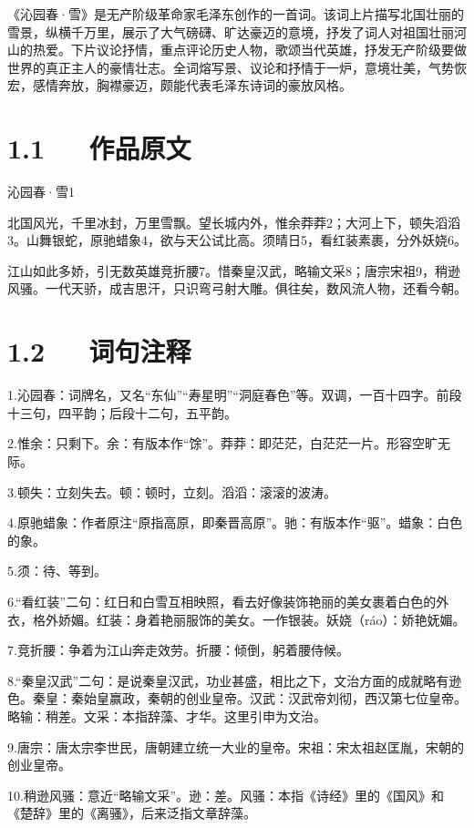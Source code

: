 \documentclass[letterpaper,12pt,english]{sphinxmanual}
\begin{document}
《沁园春·雪》是无产阶级革命家毛泽东创作的一首词。该词上片描写北国壮丽的雪景，纵横千万里，展示了大气磅礴、旷达豪迈的意境，抒发了词人对祖国壮丽河山的热爱。下片议论抒情，重点评论历史人物，歌颂当代英雄，抒发无产阶级要做世界的真正主人的豪情壮志。全词熔写景、议论和抒情于一炉，意境壮美，气势恢宏，感情奔放，胸襟豪迈，颇能代表毛泽东诗词的豪放风格。


\section{1.1   作品原文}
\label{\detokenize{p01_u6563_u6587/_u6bdb_u6cfd_u4e1c-_u6c81_u56ed_u6625_xb7_u96ea:id3}}
沁园春·雪1

北国风光，千里冰封，万里雪飘。望长城内外，惟余莽莽2；大河上下，顿失滔滔3。山舞银蛇，原驰蜡象4，欲与天公试比高。须晴日5，看红装素裹，分外妖娆6。

江山如此多娇，引无数英雄竞折腰7。惜秦皇汉武，略输文采8；唐宗宋祖9，稍逊风骚。一代天骄，成吉思汗，只识弯弓射大雕。俱往矣，数风流人物，还看今朝。


\section{1.2   词句注释}
\label{\detokenize{p01_u6563_u6587/_u6bdb_u6cfd_u4e1c-_u6c81_u56ed_u6625_xb7_u96ea:id4}}
1.沁园春：词牌名，又名“东仙”“寿星明”“洞庭春色”等。双调，一百十四字。前段十三句，四平韵；后段十二句，五平韵。

2.惟余：只剩下。余：有版本作“馀”。莽莽：即茫茫，白茫茫一片。形容空旷无际。

3.顿失：立刻失去。顿：顿时，立刻。滔滔：滚滚的波涛。

4.原驰蜡象：作者原注“原指高原，即秦晋高原”。驰：有版本作“驱”。蜡象：白色的象。

5.须：待、等到。

6.“看红装”二句：红日和白雪互相映照，看去好像装饰艳丽的美女裹着白色的外衣，格外娇媚。红装：身着艳丽服饰的美女。一作银装。妖娆（ráo）：娇艳妩媚。

7.竞折腰：争着为江山奔走效劳。折腰：倾倒，躬着腰侍候。

8.“秦皇汉武”二句：是说秦皇汉武，功业甚盛，相比之下，文治方面的成就略有逊色。秦皇：秦始皇赢政，秦朝的创业皇帝。汉武：汉武帝刘彻，西汉第七位皇帝。略输：稍差。文采：本指辞藻、才华。这里引申为文治。

9.唐宗：唐太宗李世民，唐朝建立统一大业的皇帝。宋祖：宋太祖赵匡胤，宋朝的创业皇帝。

10.稍逊风骚：意近“略输文采”。逊：差。风骚：本指《诗经》里的《国风》和《楚辞》里的《离骚》，后来泛指文章辞藻。
\end{document}
